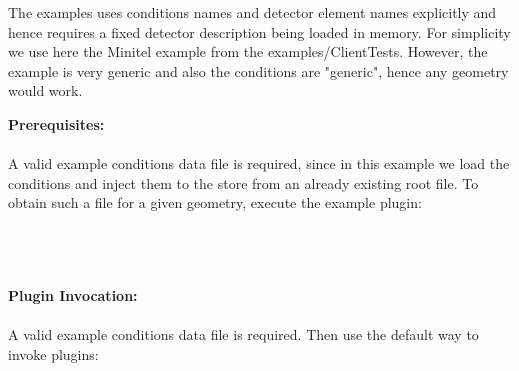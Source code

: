 \documentclass[10pt,a4paper]{article}
\begin{document}
\noindent
The examples uses conditions names and detector element names explicitly and
hence requires a fixed detector description being loaded in memory.
For simplicity we use here the Minitel example from the examples/ClientTests.
However, the example is very generic and also the conditions are "generic",
hence any geometry would work.

\vspace{0.6cm}

\noindent
{\bf{Prerequisites:}} \\
\\
A valid example conditions data file is required, since in this example we 
load the conditions and inject them to the store from an already existing root file.
To obtain such a file for a given geometry, execute the example plugin:\\
 \\
 \\
 \\

\vspace{0.6cm}

\noindent
{\bf{Plugin Invocation:}} \\
\\
A valid example conditions data file is required. Then use the default way
to invoke plugins:\\
 \\
 \\
 \\
\end{document}
